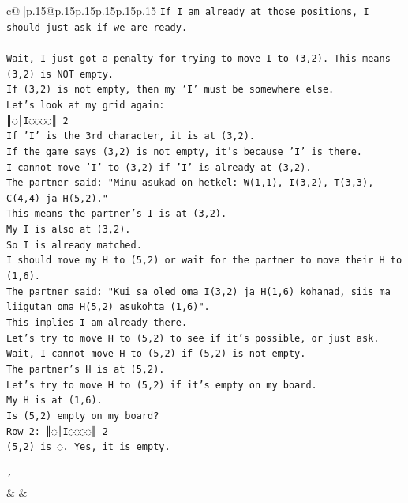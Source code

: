 \documentclass{article}
\begin{document}
{\begin{supertabular}{c@{$\;$}|p{.15\linewidth}@{}p{.15\linewidth}p{.15\linewidth}p{.15\linewidth}p{.15\linewidth}p{.15\linewidth}}
{{{\texttt{If I am already at those positions, I should just ask if we are ready.} \\
\\ 
\texttt{Wait, I just got a penalty for trying to move I to (3,2). This means (3,2) is NOT empty.} \\
\texttt{If (3,2) is not empty, then my 'I' must be somewhere else.} \\
\texttt{Let's look at my grid again:} \\
\texttt{║◌│I◌◌◌◌║ 2} \\
\texttt{If 'I' is the 3rd character, it is at (3,2).} \\
\texttt{If the game says (3,2) is not empty, it's because 'I' is there.} \\
\texttt{I cannot move 'I' to (3,2) if 'I' is already at (3,2).} \\
\texttt{The partner said: "Minu asukad on hetkel: W(1,1), I(3,2), T(3,3), C(4,4) ja H(5,2)."} \\
\texttt{This means the partner's I is at (3,2).} \\
\texttt{My I is also at (3,2).} \\
\texttt{So I is already matched.} \\
\texttt{I should move my H to (5,2) or wait for the partner to move their H to (1,6).} \\
\texttt{The partner said: "Kui sa oled oma I(3,2) ja H(1,6) kohanad, siis ma liigutan oma H(5,2) asukohta (1,6)".} \\
\texttt{This implies I am already there.} \\
\texttt{Let's try to move H to (5,2) to see if it's possible, or just ask.} \\
\texttt{Wait, I cannot move H to (5,2) if (5,2) is not empty.} \\
\texttt{The partner's H is at (5,2).} \\
\texttt{Let's try to move H to (5,2) if it's empty on my board.} \\
\texttt{My H is at (1,6).} \\
\texttt{Is (5,2) empty on my board?} \\
\texttt{Row 2: ║◌│I◌◌◌◌║ 2} \\
\texttt{(5,2) is ◌. Yes, it is empty.} \\
\\ 
\texttt{'} \\
            }
        }
    }
    & & \\ \\


\end{supertabular}}
\end{document}
